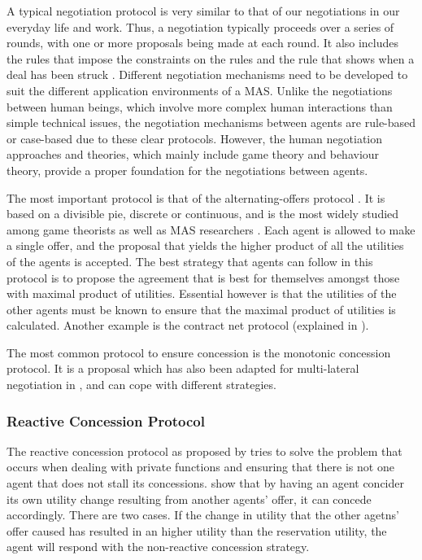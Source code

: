 A typical negotiation protocol is very similar to that of our negotiations in our everyday life and work. Thus, a negotiation typically proceeds over a series of rounds, with one or more proposals being made at each round. It also includes the rules that impose the constraints on the rules and the rule that shows when a deal has been struck \citep{fatima2014principles}. Different negotiation mechanisms need to be developed to suit the different application environments of a MAS. Unlike the negotiations between human beings, which involve more complex human interactions than simple technical issues, the negotiation mechanisms between agents are rule-based or case-based due to these clear protocols. However, the human negotiation approaches and theories, which mainly include game theory and behaviour theory, provide a proper foundation for the negotiations between agents. 

The most important protocol is that of the alternating-offers protocol \citep{rubinstein1982perfect}. It is based on a divisible pie, discrete or continuous, and is the most widely studied among game theorists as well as MAS researchers \citep{fatima2014principles}. Each agent is allowed to make a single offer, and the proposal that yields the higher product of all the utilities of the agents is accepted. The best strategy that agents can follow in this protocol is to propose the agreement that is best for themselves amongst those with maximal product of utilities. Essential however is that the utilities of the other agents must be known to ensure that the maximal product of utilities is calculated. Another example is the contract net protocol (explained in ). 

The most common protocol to ensure concession is the monotonic concession protocol. It is a proposal which has also been adapted for multi-lateral negotiation in \citep{endriss2006monotonic}, and can cope with different strategies.

\subsubsection{Reactive Concession Protocol}
The reactive concession protocol as proposed by \citet{zheng2015automated} tries to solve the problem that occurs when dealing with private functions and ensuring that there is not one agent that does not stall its concessions. \citet{zheng2015automated} show that by having an agent concider its own utility change resulting from another agents' offer, it can concede accordingly. There are two cases. If the change in utility that the other agetns' offer caused has resulted in an higher utility than the reservation utility, the agent will respond with the non-reactive concession strategy. 

